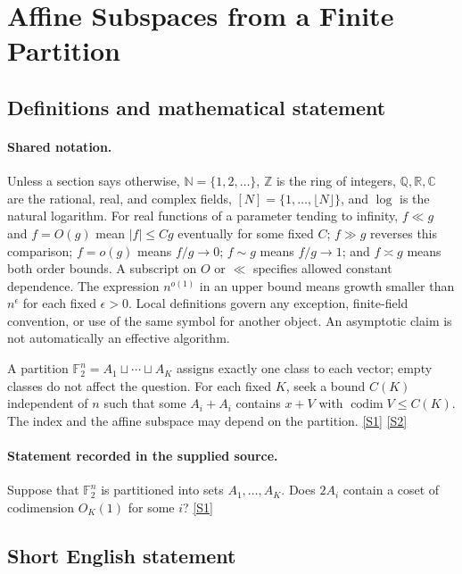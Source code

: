 \documentclass[11pt,a4paper]{article}
\newcommand{\N}{\mathbb{N}}
\newcommand{\Z}{\mathbb{Z}}
\newcommand{\Q}{\mathbb{Q}}
\newcommand{\R}{\mathbb{R}}
\newcommand{\C}{\mathbb{C}}
\newcommand{\F}{\mathbb{F}}
\newcommand{\sref}[2]{\hyperlink{source:#1:#2}{[S#2]}}
\begin{document}
\section{Affine Subspaces from a Finite Partition}\label{statement}


\subsection{Definitions and mathematical statement}

\paragraph{Shared notation.}Unless a section says otherwise, $\N=\{1,2,\ldots\}$,
$\Z$ is the ring of integers, $\Q,\R,\C$ are the rational, real, and complex
fields, $[N]=\{1,\ldots,\lfloor N\rfloor\}$, and $\log$ is the natural
logarithm. For real functions of a parameter tending to infinity,
$f\ll g$ and $f=O(g)$ mean $|f|\leq Cg$ eventually for some fixed $C$;
$f\gg g$ reverses this comparison; $f=o(g)$ means $f/g\to0$;
$f\sim g$ means $f/g\to1$; and $f\asymp g$ means both order bounds.
A subscript on $O$ or $\ll$ specifies allowed constant dependence.
The expression $n^{o(1)}$ in an upper bound means growth smaller than
$n^\epsilon$ for each fixed $\epsilon>0$. Local definitions govern any
exception, finite-field convention, or use of the same symbol for another
object. An asymptotic claim is not automatically an effective algorithm.



A partition $\F_2^n=A_1\sqcup\cdots\sqcup A_K$ assigns exactly one class to each vector; empty classes do not affect the question. For each fixed $K$, seek a bound $C(K)$ independent of $n$ such that some $A_i+A_i$ contains $x+V$ with $\operatorname{codim}V\leq C(K)$. The index and the affine subspace may depend on the partition. \sref{statement}{1} \sref{statement}{2}

\paragraph{Statement recorded in the supplied source.}
Suppose that $\mathbb{F}_2^n$ is partitioned into sets $A_1, \dots, A_K$. Does $2A_i$ contain a coset of codimension $O_K(1)$ for some $i$? \sref{statement}{1}

\subsection{Short English statement}
\end{document}
